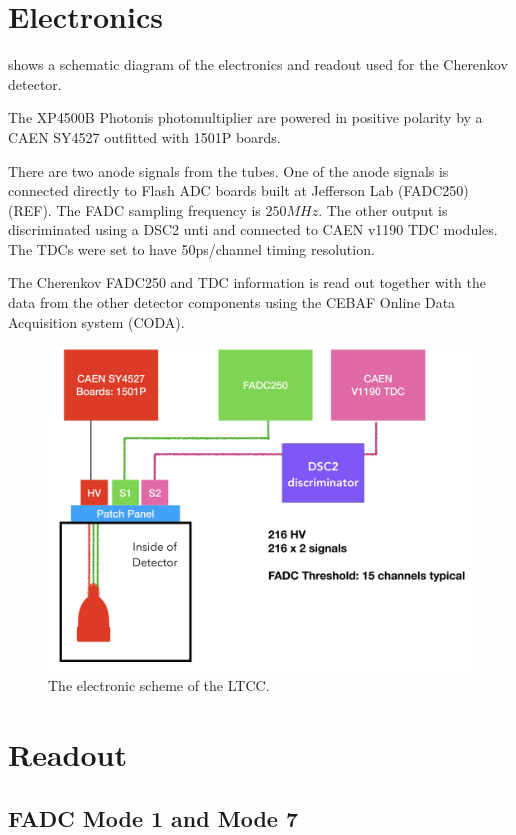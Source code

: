 \section{Electronics}

 shows a schematic diagram of the electronics and readout used for the Cherenkov detector.

The XP4500B Photonis photomultiplier are powered in positive polarity by a CAEN SY4527 outfitted with 1501P boards.

There are two anode signals from the tubes. One of the anode signals is connected directly to Flash ADC
boards built at Jefferson Lab (FADC250)(REF). The FADC sampling frequency is $250 MHz$. The other output is discriminated using a DSC2 unti and connected to CAEN v1190 TDC modules.
The TDCs were set to have 50ps/channel timing resolution.

The Cherenkov FADC250 and TDC information is read out together with the data from the other detector components using the CEBAF Online Data Acquisition system (CODA).

\begin{figure}
	\centering
	\includegraphics[width=0.95\columnwidth,keepaspectratio]{img/electronicScheme.png}
	\caption{The electronic scheme of the LTCC.}
	\label{fig:electronicScheme}
\end{figure}

\section{Readout}


\subsection{FADC Mode 1 and Mode 7}


